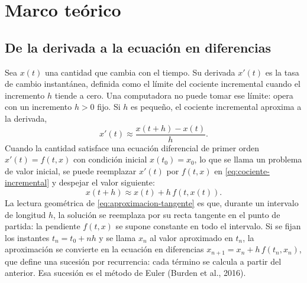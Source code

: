 \section{Marco teórico}
\label{sec:marco-teorico}

\subsection{De la derivada a la ecuación en diferencias}
\label{subsec:derivada-diferencias}

Sea $x(t)$ una cantidad que cambia con el tiempo. Su derivada $x'(t)$ es la tasa de cambio
instantánea, definida como el límite del cociente incremental cuando el incremento $h$ tiende a
cero. Una computadora no puede tomar ese límite: opera con un incremento $h > 0$ fijo. Si $h$ es
pequeño, el cociente incremental aproxima a la derivada,
\begin{equation}
  x'(t) \approx \frac{x(t+h) - x(t)}{h} .
  \label{eq:cociente-incremental}
\end{equation}
Cuando la cantidad satisface una ecuación diferencial de primer orden $x'(t) = f(t, x)$ con
condición inicial $x(t_0) = x_0$, lo que se llama un problema de valor inicial, se puede
reemplazar $x'(t)$ por $f(t, x)$ en \eqref{eq:cociente-incremental} y despejar el valor
siguiente:
\begin{equation}
  x(t+h) \approx x(t) + h\, f(t, x(t)) .
  \label{eq:aproximacion-tangente}
\end{equation}
La lectura geométrica de \eqref{eq:aproximacion-tangente} es que, durante un intervalo de
longitud $h$, la solución se reemplaza por su recta tangente en el punto de partida: la
pendiente $f(t, x)$ se supone constante en todo el intervalo. Si se fijan los instantes
$t_n = t_0 + nh$ y se llama $x_n$ al valor aproximado en $t_n$, la aproximación se convierte en
la ecuación en diferencias $x_{n+1} = x_n + h\, f(t_n, x_n)$, que define una sucesión por
recurrencia: cada término se calcula a partir del anterior. Esa sucesión es el método de Euler
(Burden et al., 2016).

